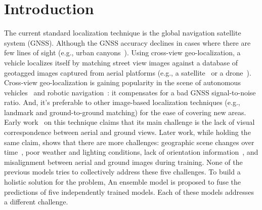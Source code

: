 \documentclass[10pt,letterpaper]{article}
\newif\ifhighlight
\newcommand{\hlb}[1]{\ifhighlight{\hl{#1}}\else{#1}\fi}
\begin{document}
\section*{Introduction}
The current standard localization technique is the global navigation satellite system (GNSS). Although the GNSS accuracy declines in cases where there are few lines of sight (e.g., urban canyons~\cite{bib1}). Using cross-view geo-localization, a vehicle localizes itself by matching street view images against a database of geotagged images captured from aerial platforms (e.g., a satellite~\cite{bib2} or a drone~\cite{bib3}). Cross-view geo-localization is gaining popularity in the scene of autonomous vehicles~\cite{bib2} and robotic navigation~\cite{bib25}: it compensates for a bad GNSS signal-to-noise ratio. And, it’s preferable to other image-based localization techniques (e.g., landmark and ground-to-ground matching) for the ease of covering new areas. Early work~\cite{bib37} on this technique \hlb{claims} that its main challenge is the lack of visual correspondence between aerial and ground views. Later work, while holding the same claim, \hlb{shows} that there are more challenges: geographic scene changes over time~\cite{bib6,bib7,bib8,bib9,bib10}, poor weather and lighting conditions, lack of orientation information~\cite{bib4}, and misalignment between aerial and ground images during training.
None of the previous models \hlb{tries} to collectively address these five challenges. To build a holistic solution for the problem, \hlb{An ensemble model is proposed} to fuse the predictions of five independently trained models. Each of these models addresses a different challenge.
\end{document}
